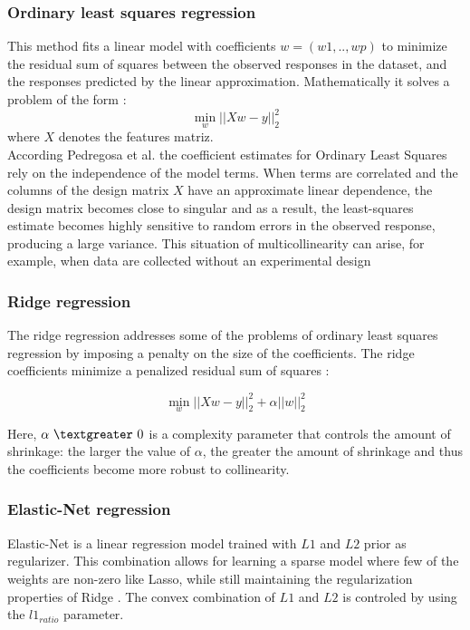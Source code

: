 \documentclass[review,authoryear,english]{elsarticle}
\begin{document}
\subsubsection{Ordinary least squares regression}
This method fits a linear model with coefficients $w = (w1,..,wp)$ to minimize the residual sum of squares between the observed responses in the dataset, and the responses predicted by the linear approximation. Mathematically it solves a problem of the form \citep{scikitlearn2011}:
$$\min_{w} \Bigr| \Bigr| Xw - y \Bigr| \Bigr|_2^2  $$
where $X$ denotes the features matriz. \\
According Pedregosa et al. \citep{scikitlearn2011}  the coefficient estimates for Ordinary Least Squares rely on the independence of the model terms. When terms are correlated and the columns of the design matrix $X$ have an approximate linear dependence, the design matrix becomes close to singular and as a result, the least-squares estimate becomes highly sensitive to random errors in the observed response, producing a large variance. This situation of multicollinearity can arise, for example, when data are collected without an experimental design

\subsubsection{Ridge regression}
The ridge regression addresses some of the problems of ordinary least squares regression by imposing a penalty on the size of the coefficients. The ridge coefficients minimize a penalized residual sum of squares  \citep{scikitlearn2011}:

$$\min_{w} { \Bigr| \Bigr| Xw - y \Bigr| \Bigr|_2^2  + \alpha \Bigr| \Bigr| w \Bigr| \Bigr|_2^2 } $$

Here, $\alpha \ \textgreater \  0$ is a complexity parameter that controls the amount of shrinkage: the larger the value of $\alpha$, the greater the amount of shrinkage and thus the coefficients become more robust to collinearity.

\subsubsection{Elastic-Net regression}
Elastic-Net is a linear regression model trained with $L1$ and $L2$ prior as regularizer. This combination allows for learning a sparse model where few of the weights are non-zero like Lasso, while still maintaining the regularization properties of Ridge  \citep{scikitlearn2011}. The convex combination of $L1$ and $L2$ is controled by using the $l1_{ratio}$ parameter.
\end{document}
